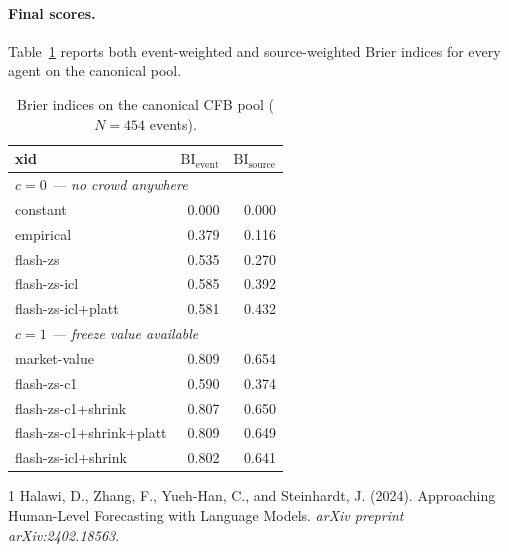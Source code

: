 \documentclass[11pt]{article}
\begin{document}
\paragraph{Final scores.} Table~\ref{tab:scores} reports both
event-weighted and source-weighted Brier indices for every agent on the
canonical pool.

\begin{table}[h]
  \centering
  \begin{tabular}{lrr}
    \toprule
    \textbf{xid} & $\mathrm{BI}_{\text{event}}$ & $\mathrm{BI}_{\text{source}}$ \\
    \midrule
    \multicolumn{3}{l}{\emph{$c = 0$ — no crowd anywhere}} \\
    constant            & 0.000 & 0.000 \\
    empirical           & 0.379 & 0.116 \\
    flash-zs            & 0.535 & 0.270 \\
    flash-zs-icl        & 0.585 & 0.392 \\
    flash-zs-icl+platt  & 0.581 & 0.432 \\
    \midrule
    \multicolumn{3}{l}{\emph{$c = 1$ — freeze value available}} \\
    market-value           & 0.809 & 0.654 \\
    flash-zs-c1            & 0.590 & 0.374 \\
    flash-zs-c1+shrink     & 0.807 & 0.650 \\
    flash-zs-c1+shrink+platt & 0.809 & 0.649 \\
    flash-zs-icl+shrink    & 0.802 & 0.641 \\
    \bottomrule
  \end{tabular}
  \caption{Brier indices on the canonical CFB pool ($N = 454$ events).}
  \label{tab:scores}
\end{table}


\begin{thebibliography}{1}
Halawi, D., Zhang, F., Yueh-Han, C., and Steinhardt, J. (2024).
\newblock Approaching Human-Level Forecasting with Language Models.
\newblock \emph{arXiv preprint arXiv:2402.18563}.
\end{thebibliography}
\end{document}
